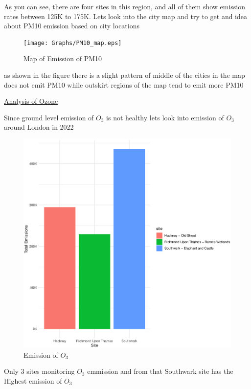 \documentclass[]{article}
\begin{document}
As you can see, there are four sites in this region, and all of them show emission rates between 125K to 175K. Lets look into the city map and try to get and idea about PM10 emission based on city locations

\begin{figure}[H]
	\centering
	\texttt{[image: Graphs/PM10\_map.eps]}
	\caption{Map of Emission of PM10}
	\label{fig:PM10.3}
\end{figure}

as shown in the figure there is a slight pattern of middle of the cities in the map does not emit PM10 while outskirt regions of the map tend to emit more PM10

\pagebreak  


\underline{{\large Analysis of Ozone}}

\vspace{12pt}

Since ground level emission of $O_3$ is not healthy lets look into emission of $O_3$ around London in 2022

\begin{figure}[H]
	\centering
	\includegraphics[width=1\textwidth]{Graphs/O3_by_site_graph.eps}
	\caption{ Emission of $O_3$}
	\label{fig:03.1}
\end{figure}

Only 3 sites monitoring $O_3$ emmission and from that Southwark site has the Highest emission of $O_3$ 
\end{document}
